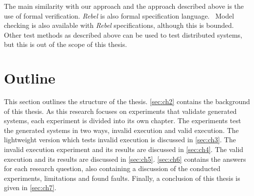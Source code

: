 The main similarity with our approach and the approach described above is the
use of formal verification. \textit{Rebel} is also formal specification
language.~\cite[p.~1]{stoel_storm_vinju_bosman_2016} Model checking is also
available with \textit{Rebel} specifications, although this is bounded. Other
test methods as described above can be used to test distributed systems, but
this is out of the scope of this thesis.

\section{Outline}
This section outlines the structure of the thesis. \autoref{sec:ch2} contains
the background of this thesis. As this research focuses on experiments that
validate generated systems, each experiment is divided into its own chapter.
The experiments test the generated systems in two ways, invalid execution and
valid execution. The lightweight version which tests invalid execution is
discussed in \autoref{sec:ch3}. The invalid execution experiment and its results
are discussed in \autoref{sec:ch4}. The valid execution and its results are
discussed in \autoref{sec:ch5}. \autoref{sec:ch6} contains the answers for each
research question, also containing a discussion of the conducted experiments,
limitations and found faults. Finally, a conclusion of this thesis is given in
\autoref{sec:ch7}.
